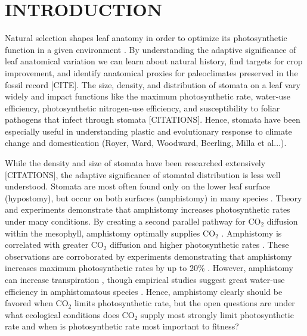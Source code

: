 \documentclass[12pt, oneside]{article}
\begin{document}
\section*{INTRODUCTION}

Natural selection shapes leaf anatomy in order to optimize its photosynthetic function in a given environment \citep{Haberlandt_1914, Givnish_1987, Smith_etal_1997}. By understanding the adaptive significance of leaf anatomical variation we can learn about natural history, find targets for crop improvement, and identify anatomical proxies for paleoclimates preserved in the fossil record [CITE]. The size, density, and distribution of stomata on a leaf vary widely and impact functions like the maximum photosynthetic rate, water-use efficiency, photosynthetic nitrogen-use efficiency, and susceptibility to foliar pathogens that infect through stomata [CITATIONS]. Hence, stomata have been especially useful in understanding plastic and evolutionary response to climate change and domestication (Royer, Ward, Woodward, Beerling, Milla et al...).

While the density and size of stomata have been researched extensively [CITATIONS], the adaptive significance of stomatal distribution is less well understood. Stomata are most often found only on the lower leaf surface (hypostomy), but occur on both surfaces (amphistomy) in many species \citep{Metcalfe_Chalk_1950, Parkhurst_1978, Mott_etal_1982}. Theory and experiments demonstrate that amphistomy increases photosynthetic rates under many conditions. By creating a second parallel pathway for CO$_2$ diffusion within the mesophyll, amphistomy optimally supplies CO$_2$ \citep{Parkhurst_1978, Gutschick_1984b, Jones_1985}. Amphistomy is correlated with greater CO$_2$ diffusion \citep{Beerling_Kelly_1996} and higher photosynthetic rates \citep{Mckown_etal_2014}. These observations are corroborated by experiments demonstrating that amphistomy increases maximum photosynthetic rates by up to 20\% \citep{Parkhurst_Mott_1990}. However, amphistomy can increase transpiration \citep{Jones_1985, Foster_Smith_1986}, though empirical studies suggest great water-use efficiency in amphistomatous species \citep{Bucher_etal_2017}. Hence, amphistomy clearly should be favored when CO$_2$ limits photosynthetic rate, but the open questions are under what ecological conditions does CO$_2$ supply most strongly limit photosynthetic rate \citep{Peat_Fitter_1994b} and when is photosynthetic rate most important to fitness?
\end{document}
